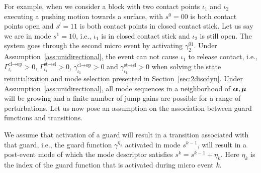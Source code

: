 \documentclass[../DC2019003Bouma.tex]{subfiles}
\begin{document}
For example, when we consider a block with two contact points $\iota_1$ and $\iota_2$ executing a pushing motion towards a surface, with $s^0 = 00$ is both contact points open and $s^l = 11$ is both contact points in closed contact stick. Let us say we are in mode $s^1 = 10$, i.e., $\iota_1$ is in closed contact stick and $\iota_2$ is still open. The system goes through the second micro event by activating $\gamma^{01}_2$. Under Assumption~\ref{ass:unidirectional}, the event can not cause $\iota_1$ to release contact, i.e., $\Gamma_{\iota_1}^{\text{cl}\rightarrow\text{op}}>0$, $\Gamma_{\iota_1}^{\text{st}\rightarrow\text{sl}}>0$, $\gamma_{\iota_1}^{\text{cl}\rightarrow\text{op}}>0$ and $\gamma_{\iota_1}^{\text{st}\rightarrow\text{sl}}>0$ when solving the state reinitialization and mode selection presented in Section~\ref{sec:2discdyn}. Under Assumption~\ref{ass:unidirectional}, all mode sequences in a neighborhood of $\boldsymbol{\alpha},\boldsymbol{\mu}$ will be growing and a finite number of jump gains are possible for a range of perturbations. Let us now pose an assumption on the association between guard functions and transitions.

\begin{sloppypar}
\begin{myass}\label{ass:guardtrans}
We assume that activation of a guard will result in a transition associated with that guard, i.e., the guard function $\gamma^{\eta_k}$ activated in mode $s^{k-1}$, will result in a post-event mode of which the mode descriptor satisfies $s^{k} = s^{k-1} + \eta_k$. Here $\eta_k$ is the index of the guard function that is activated during micro event $k$.
\end{myass}
\end{sloppypar}
\end{document}
